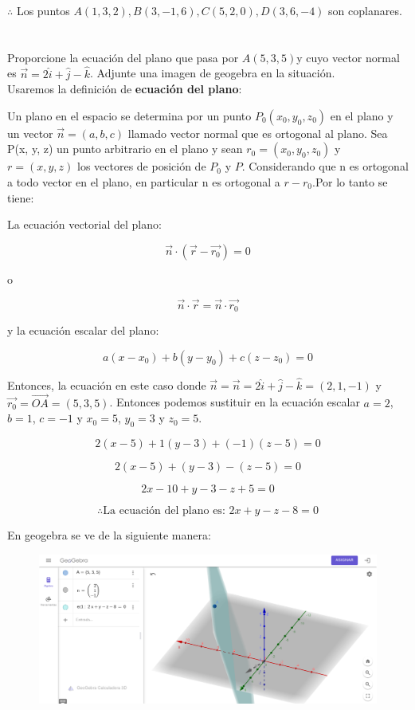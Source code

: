 \documentclass[12pt]{article}
\begin{document}
$\therefore$ Los puntos $A(1,3,2) , B(3,-1,6), C(5,2,0), D(3,6,-4)$ son coplanares.

\section{}

Proporcione la ecuación del plano que pasa por $A(5,3,5)$y cuyo vector normal es $\vec{n}=2\hat{i} + \hat{j} - \hat{k}$. Adjunte una imagen de geogebra en la situación. \\

Usaremos la definición de \textbf{ecuación del plano}:

Un plano en el espacio se determina por un punto $P_0(x_0, y_0, z_0)$ en el plano y un vector $\vec{n}=(a,b,c)$ llamado vector normal que es ortogonal al plano. Sea P(x, y, z) un punto arbitrario en el plano y sean $r_0 = (x_0, y_0, z_0)$ y $r = (x, y,z)$ los vectores de posición de $P_0$ y $P$. Considerando que n es ortogonal a todo vector en el plano, en particular n es ortogonal a $r-r_0$.Por lo tanto se tiene:

La ecuación vectorial del plano:

\[
\vec{n} \cdot (\vec{r} - \vec{r_0}) = 0
\]

o

\[
\vec{n} \cdot \vec{r} = \vec{n} \cdot \vec{r_0}
\]

y la ecuación escalar del plano:

\[
a(x-x_0) + b(y-y_0)+c(z-z_0) = 0
\]

Entonces, la ecuación en este caso donde $\vec{n} = \vec{n}=2\hat{i} + \hat{j} - \hat{k} = (2, 1, -1)$ y $\vec{r_0}= \vec{OA} = (5,3,5)$. Entonces podemos sustituir en la ecuación escalar $a=2$, $b=1$, $c=-1$ y $x_0=5$, $y_0=3$ y $z_0=5$.

\[
2(x-5) + 1(y-3)+(-1)(z-5) = 0
\]

\[
2(x-5) +(y-3)-(z-5) = 0
\]

\[
2x-10 +y-3-z+5 = 0
\]

\[
\therefore \text{La ecuación del plano es: } 2x+y-z-8 = 0
\]

En geogebra se ve de la siguiente manera:

\begin{figure}[H]
  \centering
  \includegraphics[width=1\textwidth]{./img/planoEc.png}
\end{figure}
\end{document}

